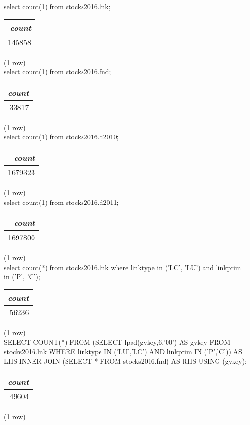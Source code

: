 select count(1) from stocks2016.lnk;
\begin{tabular}{r}
\textit{count} \\
\hline
145858 \\
\end{tabular}

\noindent (1 row) \\

select count(1) from stocks2016.fnd;
\begin{tabular}{r}
\textit{count} \\
\hline
33817 \\
\end{tabular}

\noindent (1 row) \\

select count(1) from stocks2016.d2010;
\begin{tabular}{r}
\textit{count} \\
\hline
1679323 \\
\end{tabular}

\noindent (1 row) \\

select count(1) from stocks2016.d2011;
\begin{tabular}{r}
\textit{count} \\
\hline
1697800 \\
\end{tabular}

\noindent (1 row) \\

select count(*) from stocks2016.lnk where linktype in ('LC', 'LU') and linkprim in ('P', 'C');
\begin{tabular}{r}
\textit{count} \\
\hline
56236 \\
\end{tabular}

\noindent (1 row) \\

SELECT COUNT(*) FROM
(SELECT lpad(gvkey,6,'00') AS gvkey FROM stocks2016.lnk WHERE linktype IN ('LU','LC') AND linkprim IN ('P','C')) AS LHS
INNER JOIN
(SELECT * FROM stocks2016.fnd) AS RHS
 USING (gvkey);
\begin{tabular}{r}
\textit{count} \\
\hline
49604 \\
\end{tabular}

\noindent (1 row) \\

